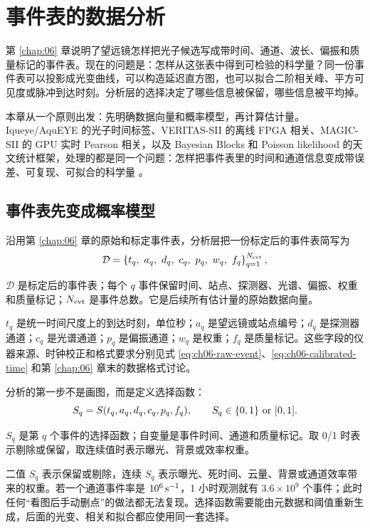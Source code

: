 \chapter{事件表的数据分析}
\label{chap:07}

\begin{chapteropening}
第 \ref{chap:06} 章说明了望远镜怎样把光子候选写成带时间、通道、波长、偏振和质量标记的事件表。现在的问题是：怎样从这张表中得到可检验的科学量？同一份事件表可以投影成光变曲线，可以构造延迟直方图，也可以拟合二阶相关峰、平方可见度或脉冲到达时刻。分析层的选择决定了哪些信息被保留，哪些信息被平均掉。

本章从一个原则出发：先明确数据向量和概率模型，再计算估计量。Iqueye/AquEYE 的光子时间标签、VERITAS-SII 的离线 FPGA 相关、MAGIC-SII 的 GPU 实时 Pearson 相关，以及 Bayesian Blocks 和 Poisson likelihood 的天文统计框架，处理的都是同一个问题：怎样把事件表里的时间和通道信息变成带误差、可复现、可拟合的科学量 \citep{2009A&A...508..531N,2009JMOp...56..261B,2020NatAs...4.1164A,2024MNRAS.529.4387A,1979ApJ...228..939C,2013ApJ...764..167S}。
\end{chapteropening}

\section{事件表先变成概率模型}

沿用第 \ref{chap:06} 章的原始和标定事件表，分析层把一份标定后的事件表简写为
\begin{equation}
  \mathcal{D}
  =
  \left\{
  t_q,\ a_q,\ d_q,\ c_q,\ p_q,\ w_q,\ f_q
  \right\}_{q=1}^{N_{\rm evt}},
  \label{eq:ch07-event-data}
\end{equation}
\begin{formulaexplain}
\(\mathcal D\) 是标定后的事件表；每个 \(q\) 事件保留时间、站点、探测器、光谱、偏振、权重和质量标记；\(N_{\rm evt}\) 是事件总数。它是后续所有估计量的原始数据向量。
\end{formulaexplain}
\(t_q\) 是统一时间尺度上的到达时刻，单位秒；\(a_q\) 是望远镜或站点编号；\(d_q\) 是探测器通道；\(c_q\) 是光谱通道；\(p_q\) 是偏振通道；\(w_q\) 是权重；\(f_q\) 是质量标记。这些字段的仪器来源、时钟校正和格式要求分别见式 \eqref{eq:ch06-raw-event}、\eqref{eq:ch06-calibrated-time} 和第 \ref{chap:06} 章末的数据格式讨论。

分析的第一步不是画图，而是定义选择函数：
\begin{equation}
  S_q =
  S(t_q,a_q,d_q,c_q,p_q,f_q),
  \qquad
  S_q \in \{0,1\}\ {\rm or}\ [0,1].
  \label{eq:ch07-selection}
\end{equation}
\begin{formulaexplain}
\(S_q\) 是第 \(q\) 个事件的选择函数；自变量是事件时间、通道和质量标记。取 0/1 时表示剔除或保留，取连续值时表示曝光、背景或效率权重。
\end{formulaexplain}
二值 \(S_q\) 表示保留或剔除，连续 \(S_q\) 表示曝光、死时间、云量、背景或通道效率带来的权重。若一个通道事件率是 \(10^6\,{\rm s^{-1}}\)，1 小时观测就有 \(3.6\times10^9\) 个事件；此时任何“看图后手动删点”的做法都无法复现。选择函数需要能由元数据和阈值重新生成，后面的光变、相关和拟合都应使用同一套选择。

